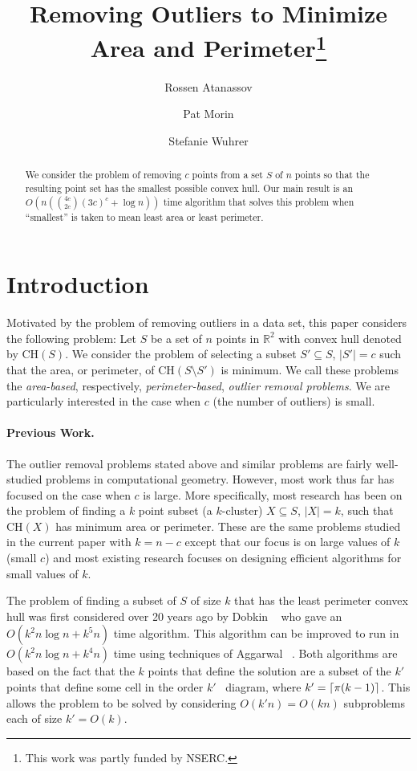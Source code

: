 \documentclass[lotsofwhite]{patmorin}
\title{
\vc{\MakeUppercase{Removing Outliers to Minimize Area and Perimeter}}
{Removing Outliers to Minimize Area and Perimeter}\thanks{This
work was partly funded by NSERC.}}
\author{Rossen Atanassov \and
	Pat Morin \and
	Stefanie Wuhrer}
\date{}
\newcommand{\ch}{\mathrm{CH}}
\newcommand{\runtime}{n\left({4c\choose 2c}(3c)^c + \log n\right)}
\newcommand{\Oruntime}{O\left(\runtime\right)}
\begin{document}
\maketitle

\begin{abstract}
We consider the problem of removing $c$ points from a set $S$ of $n$
points so that the resulting point set has the smallest possible
convex hull.  Our main result is an $\Oruntime$ time algorithm
that solves this problem when ``smallest'' is taken to mean least area
or least perimeter.
\end{abstract}

\section{Introduction}

Motivated by the problem of removing outliers in a data set, this
paper considers the following problem: Let $S$ be a set of $n$ points
in $\mathbb{R}^2$ with convex hull denoted by $\ch(S)$.  We consider
the problem of selecting a subset $S'\subseteq S$, $|S'|=c$ such that
the area, or perimeter, of $\ch(S\setminus S')$ is minimum.  We call
these problems the \emph{area-based}, respectively,
\emph{perimeter-based}, \emph{outlier removal problems}.  We are
particularly interested in the case when $c$ (the number of outliers)
is small.

\paragraph{Previous Work.} 

The outlier removal problems stated above and similar problems are
fairly well-studied problems in computational geometry.  However, most
work thus far has focused on the case when $c$ is large. More
specifically, most research has been on the problem of finding a $k$
point subset (a $k$-cluster) $X\subseteq S$, $|X|=k$, such that
$\ch(X)$ has minimum area or perimeter. These are the same problems
studied in the current paper with $k=n-c$ except that our focus is on
large values of $k$ (small $c$) and most existing research focuses on
designing efficient algorithms for small values of $k$.

The problem of finding a subset of $S$ of size $k$ that has the least
perimeter convex hull was first considered over 20 years ago by Dobkin
\etal\ \cite{ddg83} who gave an $O(k^2n\log n + k^5 n)$ time
algorithm.  This algorithm can be improved to run in $O(k^2 n\log n +
k^4 n)$ time using techniques of Aggarwal \etal\ \cite{aiks89}.  Both
algorithms are based on the fact that the $k$ points that define the
solution are a subset of the $k'$ points that define some cell in the
order $k'$ \voronoi\ diagram, where $k'=\left\lceil \pi (k-1) \right\rceil$.  This
allows the problem to be solved by considering $O(k'n)=O(kn)$ subproblems
each of size $k'=O(k)$.
\end{document}
